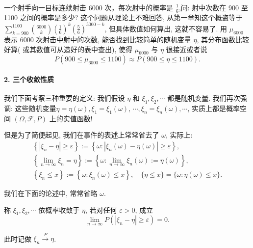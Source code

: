 \begin{example}
    一个射手向一目标连续射击 6000 次，每次射中的概率是 $\frac{1}{6}$,问: 射中次数在 900 至 1100 之间的概率是多少? 这个问题从理论上不难回答, 从第一章知这个概盗等于 $\sum_{k=900}^{1100} {6000\choose k}\left(\frac{1}{6}\right)^k\left(\frac{5}{6}\right)^{5000-k}$, 但具体数值如何算出, 这就不容易了. 用 $\mu_{6000}$ 表示 6000 次射击中射中的次数, 能否找到比较简单的随机变量 $\eta$, 其分布函数比较好算( 或其数值可从造好的表中查出), 使得 $\mu_{6000}$ 与 $\eta$ 很接近或者说
$$
P\left(900 \leqslant \mu_{6000} \leqslant 1100\right) \approx P(900 \leqslant \eta \leqslant 1100) .
$$
\end{example}

\paragraph{2. 三个收敛性质} 我们下面考察三种重要的定义: 我们假设 $\eta$ 和 $\xi_1, \xi_2, \cdots$ 都是随机变量. 我们再次强调: 这些随机变量$\eta=\eta(\omega), \xi_1=\xi_1(\omega)$, $\cdots, \xi_n=\xi_n(\omega), \cdots$, 实质上都是概率空间 $(\Omega, \mathscr{F}, P)$ 上的实值函数!

但是为了简便起见, 我们在事件的表述上常常省去了 $\omega$, 实际上:
$$
\begin{gathered}
\left\{\left|\xi_n-\eta\right| \geqslant \varepsilon\right\}:=\left\{\omega:\left|\xi_n(\omega)-\eta(\omega)\right| \geqslant \varepsilon\right\}, \\
\left\{\lim _{n \rightarrow \infty} \xi_n=\eta\right\}:=\left\{\omega: \lim _{n \rightarrow \infty} \xi_n(\omega):=\eta(\omega)\right\}, \\
\left\{\xi_n \leqslant x\right\}:=\left\{\omega: \xi_n(\omega) \leqslant x\right\}, \quad\{\eta \leqslant x\}=\{\omega: \eta(\omega) \leqslant x\} .
\end{gathered}
$$

我们在下面的论述中, 常常省略 $\omega$.

\begin{center}
\end{center}

\begin{definition}
    称 $\xi_1, \xi_2, \cdots$ 依概率收敛于 $\eta$, 若对任何 $\varepsilon>0$, 成立
$$
\lim _{n \rightarrow \infty} P\left(\left|\xi_n-\eta\right| \geqslant \varepsilon\right)=0 .
$$

此时记做 $\xi_n \stackrel{P}{\longrightarrow} \eta$.
\end{definition}

